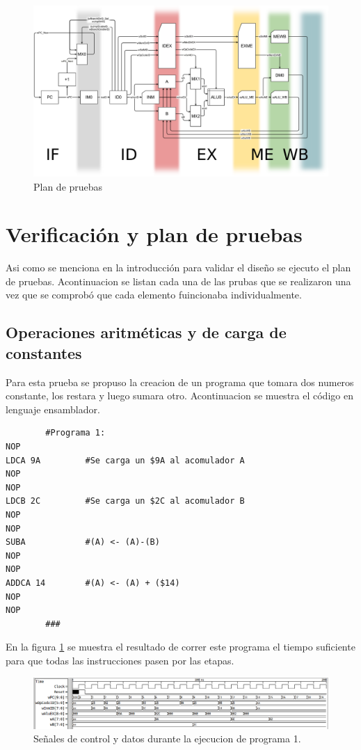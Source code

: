 \documentclass[paper=letter, fontsize=12pt]{article}
\begin{document}
\begin{figure}[hbtp]
\centering
\includegraphics[width=1\linewidth]{araucaria_pipeline}
\caption{Plan de pruebas}
\end{figure}

\section{Verificación y plan de pruebas}

Asi como se menciona en la introducción para validar el diseño se ejecuto el plan de pruebas. Acontinuacion se listan cada una de las prubas que se realizaron una vez que se comprobó que cada elemento fuincionaba individualmente.

\subsection{Operaciones aritméticas y de carga de constantes}
Para esta prueba se propuso la creacion de un programa que tomara dos numeros constante, los restara y luego sumara otro. Acontinuacion se muestra el código en lenguaje ensamblador.

\begin{lstlisting}
		#Programa 1:
NOP
LDCA 9A			#Se carga un $9A al acomulador A
NOP
NOP
LDCB 2C			#Se carga un $2C al acomulador B
NOP
NOP
SUBA			#(A) <- (A)-(B)
NOP
NOP
ADDCA 14		#(A) <- (A) + ($14)
NOP
NOP
		###
\end{lstlisting}

En la figura \ref{i:p1} se muestra el resultado de correr este programa el tiempo suficiente para que todas las instrucciones pasen por las etapas.\\

\begin{figure}[hbtp]
\centering
\includegraphics[width=1\linewidth]{../test/Prog1.png}
\caption{Señales de control y datos durante la ejecucion de programa 1.}
\label{i:p1}
\end{figure}
\end{document}
